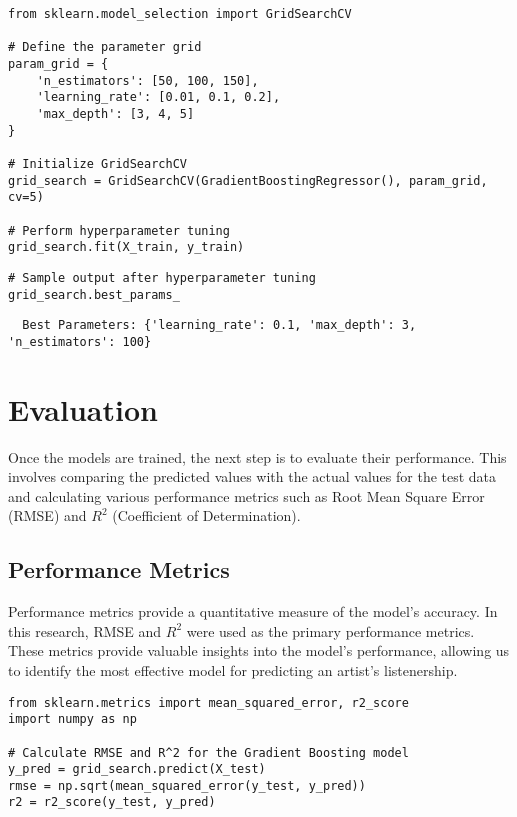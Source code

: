 \documentclass[12pt]{article}
\begin{document}
\begin{lstlisting}
from sklearn.model_selection import GridSearchCV

# Define the parameter grid
param_grid = {
    'n_estimators': [50, 100, 150],
    'learning_rate': [0.01, 0.1, 0.2],
    'max_depth': [3, 4, 5]
}

# Initialize GridSearchCV
grid_search = GridSearchCV(GradientBoostingRegressor(), param_grid, cv=5)

# Perform hyperparameter tuning
grid_search.fit(X_train, y_train)
\end{lstlisting}
\begin{lstlisting}
# Sample output after hyperparameter tuning
grid_search.best_params_
\end{lstlisting}

\begin{verbatim}
  Best Parameters: {'learning_rate': 0.1, 'max_depth': 3, 'n_estimators': 100}
\end{verbatim}
\newpage

\section{Evaluation}

Once the models are trained, the next step is to evaluate their performance. This involves comparing the predicted values with the actual values for the test data and calculating various performance metrics such as Root Mean Square Error (RMSE) and \( R^2 \) (Coefficient of Determination).

\subsection{Performance Metrics}

Performance metrics provide a quantitative measure of the model's accuracy. In this research, RMSE and \( R^2 \) were used as the primary performance metrics. These metrics provide valuable insights into the model's performance, allowing us to identify the most effective model for predicting an artist's listenership.

\begin{lstlisting}
from sklearn.metrics import mean_squared_error, r2_score
import numpy as np

# Calculate RMSE and R^2 for the Gradient Boosting model
y_pred = grid_search.predict(X_test)
rmse = np.sqrt(mean_squared_error(y_test, y_pred))
r2 = r2_score(y_test, y_pred)
\end{lstlisting}
\end{document}
